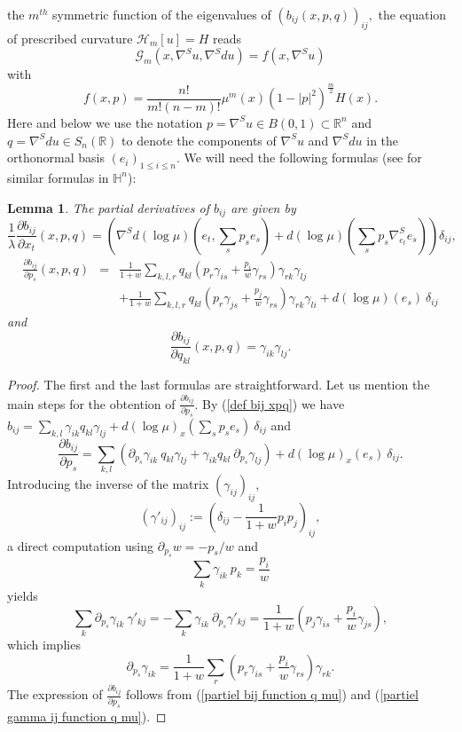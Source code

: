 \documentclass[10pt,reqno,oneside]{amsart}
\newtheorem{lem}{Lemma}[section]
\theoremstyle{definition}
\theoremstyle{remark}
\newcommand{\R}{\mathbb{R}}
\begin{document}
the $m^{th}$ symmetric function of the eigenvalues of $(b_{ij}(x,p,q))_{ij},$ the equation of prescribed curvature $\mathcal{H}_m[u]=H$ reads
\begin{equation}\label{estC2b eqn Gm=f}
\mathcal{G}_m(x,\nabla^S u,\nabla^Sdu)=f(x,\nabla^S u)
\end{equation}
with
$$f(x,p)=\frac{n!}{m!(n-m)!}\mu^m(x)(1-|p|^2)^{\frac{m}{2}}H(x).$$
Here and below we use the notation $p=\nabla^S u\in B(0,1)\subset\R^n$ and $q=\nabla^Sd u\in S_n(\R)$ to denote the components of $\nabla^S u$ and $\nabla^Sdu$ in the orthonormal basis $(e_i)_{1\leq i\leq n}.$ We will need the following formulas (see \cite{GS1} for similar formulas in $\mathbb{H}^n$):
\begin{lem}\label{lem expr partial bij}
The partial derivatives of $b_{ij}$ are given by
$$\frac{1}{\lambda}\frac{\partial b_{ij}}{\partial x_t}(x,p,q)=\left(\nabla^S d(\log\mu)(e_t,\sum_sp_se_s)+d(\log\mu)(\sum_sp_s\nabla^S_{e_t}e_s)\right)\delta_{ij},$$
\begin{eqnarray*}
\frac{\partial b_{ij}}{\partial p_s}(x,p,q)&=&\frac{1}{1+w}\sum_{k,l,r}q_{kl}\left(p_r\gamma_{is}+\frac{p_i}{w}\gamma_{rs}\right)\gamma_{rk}\gamma_{lj}\\
&&+\frac{1}{1+w}\sum_{k,l,r}q_{kl}\left(p_r\gamma_{js}+\frac{p_j}{w}\gamma_{rs}\right)\gamma_{rk}\gamma_{li}+d(\log\mu)(e_s)\ \delta_{ij}
\end{eqnarray*}
and 
$$\frac{\partial b_{ij}}{\partial q_{kl}}(x,p,q)=\gamma_{ik}\gamma_{lj}.$$
\end{lem}
\begin{proof}
The first and the last formulas are straightforward. Let us mention the main steps for the obtention of $\frac{\partial b_{ij}}{\partial p_s}$. By (\ref{def bij xpq}) we have $b_{ij}=\sum_{k,l}\gamma_{ik}q_{kl}\gamma_{lj}+d(\log\mu)_x(\sum_sp_se_s)\ \delta_{ij}$ and
\begin{equation}\label{partiel bij function q mu} 
\frac{\partial b_{ij}}{\partial p_s}=\sum_{k,l}\left(\partial_{p_s}\gamma_{ik}\ q_{kl}\gamma_{lj}+\gamma_{ik}q_{kl}\ \partial_{p_s}\gamma_{lj}\right)+d(\log\mu)_x(e_s)\ \delta_{ij}.
\end{equation}
Introducing the inverse of the matrix $(\gamma_{ij})_{ij}$, 
\begin{equation*}
(\gamma'_{ij})_{ij}:=\left(\delta_{ij}-\frac{1}{1+w}p_ip_j\right)_{ij},
\end{equation*}
a direct computation using $\partial_{p_s}w=-p_s/w$ and 
\begin{equation}\label{sum k gammaik pk}
\sum_k\gamma_{ik}\ p_k=\frac{p_i}{w}
\end{equation}
yields
$$\sum_k\partial_{p_s}\gamma_{ik}\ \gamma'_{kj}=-\sum_k\gamma_{ik}\ \partial_{p_s}\gamma'_{kj}=\frac{1}{1+w}\left(p_j\gamma_{is}+\frac{p_i}{w}\gamma_{js}\right),$$
which implies
\begin{equation}\label{partiel gamma ij function q mu} 
\partial_{p_s}\gamma_{ik}=\frac{1}{1+w}\sum_r\left(p_r\gamma_{is}+\frac{p_i}{w}\gamma_{rs}\right)\gamma_{rk}.
\end{equation}
The expression of $\frac{\partial b_{ij}}{\partial p_s}$ follows from (\ref{partiel bij function q mu}) and (\ref{partiel gamma ij function q mu}).
\end{proof}
\end{document}
